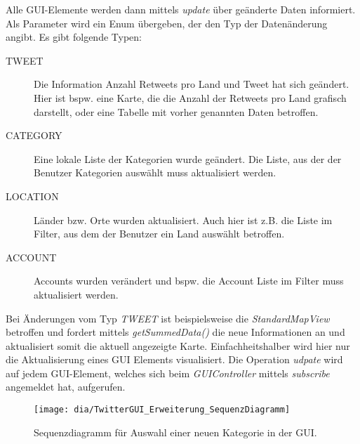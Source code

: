 Alle GUI-Elemente werden dann mittels \emph{update} über geänderte Daten informiert. Als Parameter wird ein Enum übergeben, der den Typ der Datenänderung angibt. Es gibt folgende Typen:
\begin{description}
	\item[TWEET] Die Information Anzahl Retweets pro Land und Tweet hat sich geändert. Hier ist bspw. eine Karte, die die Anzahl der Retweets pro Land grafisch darstellt, oder eine Tabelle mit vorher genannten Daten betroffen. 
	\item[CATEGORY] Eine lokale Liste der Kategorien wurde geändert. Die Liste, aus der der Benutzer Kategorien auswählt muss aktualisiert werden.
	\item[LOCATION] Länder bzw. Orte wurden aktualisiert. Auch hier ist z.B. die Liste im Filter, aus dem der Benutzer ein Land auswählt betroffen.
	\item[ACCOUNT] Accounts wurden verändert und bspw. die Account Liste im Filter muss aktualisiert werden.
\end{description}
Bei Änderungen vom Typ \emph{TWEET} ist beispielsweise die \emph{StandardMapView} betroffen und fordert mittels \emph{getSummedData()} die neue Informationen an und aktualisiert somit die aktuell angezeigte Karte. Einfachheitshalber wird hier nur die Aktualisierung eines GUI Elements visualisiert. Die Operation \emph{udpate} wird auf jedem GUI-Element, welches sich beim \emph{GUIController} mittels \emph{subscribe} angemeldet hat, aufgerufen.
\begin{figure}[h!]
	\centering
	\texttt{[image: dia/TwitterGUI\_Erweiterung\_SequenzDiagramm]}
	\caption{Sequenzdiagramm für Auswahl einer neuen Kategorie in der GUI.}
	\label{fig:GUISeq}
\end{figure}
